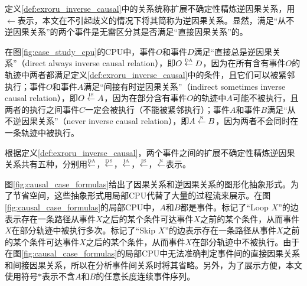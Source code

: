 定义\ref{def:exroru_inverse_causal}中的关系统称扩展不确定性精炼逆因果关系，用$\leftarrow$表示，本文在不引起歧义的情况下将其简称为逆因果关系。显然，满足“从不逆因果关系”的两个事件是无需区分其是否满足“直接因果关系”的。

\begin{example}\label{ex:exroru_inverse_causal}
在图\ref{fig:case_study_cpu}的CPU中，事件$O$和事件$D$满足“直接总是逆因果关系”（direct always inverse causal relation），即$O\overset{\text{\tiny{DA}}}{\leftarrow}D$，因为在所有含有事件$O$的轨迹中两者都满足定义\ref{def:exroru_inverse_causal}中的条件，且它们可以被紧邻执行；事件$O$和事件$A$满足“间接有时逆因果关系”（indirect sometimes inverse causal relation），即$O\overset{\text{\tiny{IS}}}{\leftarrow}A$，因为在部分含有事件$O$的轨迹中$A$可能不被执行，且两者的执行之间事件$C$一定会被执行（不能被紧邻执行）；事件$A$和事件$B$满足“从不逆因果关系”（never inverse causal relation），即$A\overset{\text{\tiny{N}}}{\leftarrow}B$，因为两者不会同时在一条轨迹中被执行。
\end{example}

根据定义\ref{def:exroru_inverse_causal}，两个事件之间的扩展不确定性精炼逆因果关系共有五种，分别用$\overset{\text{\tiny{DA}}}{\leftarrow}$，$\overset{\text{\tiny{DS}}}{\leftarrow}$，$\overset{\text{\tiny{IA}}}{\leftarrow}$，$\overset{\text{\tiny{IS}}}{\leftarrow}$，$\overset{\text{\tiny{N}}}{\leftarrow}$表示。

图\ref{fig:causal_case_formulas}给出了因果关系和逆因果关系的图形化抽象形式。为了节省空间，这些抽象形式用局部CPU代替了大量的过程流来展示。在图\ref{fig:causal_case_formulas}的局部CPU中，$A$和$B$都是事件。标记了“Loop $X$”的边表示存在一条路径从事件$X$之后的某个条件可达事件$X$之前的某个条件，从而事件$X$在部分轨迹中被执行多次。标记了“Skip $X$”的边表示存在一条路径从事件$X$之前的某个条件可达事件$X$之后的某个条件，从而事件$X$在部分轨迹中不被执行。由于在图\ref{fig:causal_case_formulas}的局部CPU中无法准确判定事件间的直接因果关系和间接因果关系，所以在分析事件间关系时将其省略。另外，为了展示方便，本文使用符号$*$表示不含$A$和$B$的任意长度连续事件序列。

